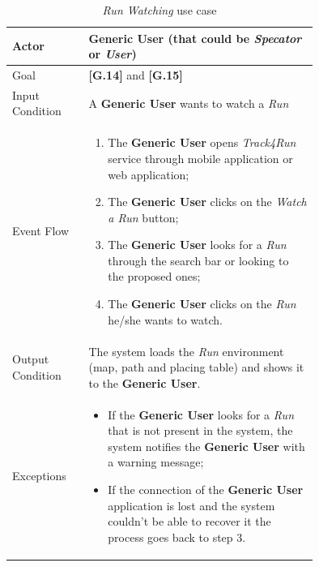 \begin{center}
\begin{table}[H]
\begin{tabular}{ | l | p{0.75\linewidth} | }
  \hline
    Actor & \textbf{Generic User} (that could be \textit{Specator} or \textit{User}) \\ \hline
    Goal & \textbf{[G.14]} and \textbf{[G.15]} \\ \hline
    Input Condition & A \textbf{Generic User} wants to watch a \textit{Run} \\ \hline
    Event Flow & \begin{minipage}[t]{0.7\textwidth}
      \begin{enumerate}
        \item The \textbf{Generic User} opens \textit{Track4Run} service through mobile application or web application;
        \item The \textbf{Generic User} clicks on the \textit{Watch a Run} button;
        \item The \textbf{Generic User} looks for a \textit{Run} through the search bar or looking to the proposed ones;
        \item The \textbf{Generic User} clicks on the \textit{Run} he/she wants to watch.
      \end{enumerate}
    \smallskip
  \end{minipage} \\ \hline
  Output Condition & The system loads the \textit{Run} environment (map, path and placing table) and  shows it to the \textbf{Generic User}. \\ \hline
  Exceptions & \begin{minipage}[t]{0.7\textwidth}
    \begin{itemize}
      \smallskip
      \item If the \textbf{Generic User} looks for a \textit{Run} that is not present in the system, the system notifies the \textbf{Generic User} with a warning message;
      \item If the connection of the \textbf{Generic User} application is lost and the system couldn't be able to recover it the process goes back to step 3.
    \end{itemize}
    \smallskip
  \end{minipage}  \\ \hline
\end{tabular}
\caption{\textit{Run Watching} use case}
\label{table:visitRunTable}
\end{table}
\end{center}

